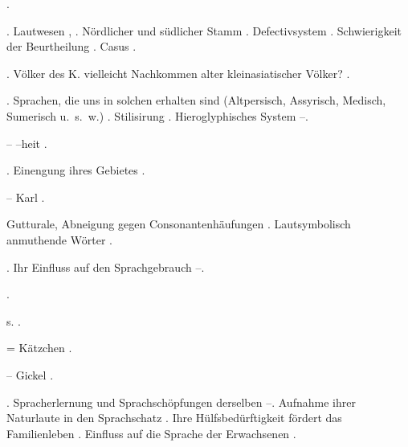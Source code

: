 \begin{register}
 \pageref{sp.257}.


. Lautwesen \pageref{sp.34}, \pageref{sp.197}. Nördlicher und südlicher Stamm \pageref{sp.142}. Defectivsystem \pageref{sp.352}. Schwierigkeit der Beurtheilung \pageref{sp.426}.  Casus \pageref{sp.463}.

. Völker des K. vielleicht Nachkommen alter kleinasiatischer Völker? \pageref{sp.146}.

.  Sprachen, die uns in solchen erhalten sind (Altpersisch, Assyrisch, Medisch, Sumerisch u.~s.~w.) \pageref{sp.114}. Stilisirung \pageref{sp.129}. Hieroglyphisches System \pageref{sp.130}–\pageref{sp.131}.

– –heit \pageref{sp.216}.

. Einengung ihres Gebietes \pageref{sp.146}. 



 – Karl \pageref{sp.230}.



  Gutturale, Abneigung gegen Consonantenhäufungen \pageref{sp.194}. Lautsymbolisch anmuthende Wörter \pageref{sp.219}. 

. Ihr Einfluss auf den Sprachgebrauch \pageref{sp.248}–\pageref{sp.249}.

 \pageref{sp.149}\sed{, \pageref{sp.257}, \pageref{sp.426}}.

 s. .

 = Kätzchen \pageref{sp.324}.

 – Gickel \pageref{sp.208}.

. Spracherlernung und Sprachschöpfungen derselben \pageref{sp.65}–\pageref{sp.67}. Aufnahme ihrer Naturlaute in den Sprachschatz \pageref{sp.154}. Ihre Hülfsbedürftigkeit fördert das Familienleben \pageref{sp.306}.  Einfluss auf die Sprache der Erwachsenen \pageref{sp.445}.


\end{register}
